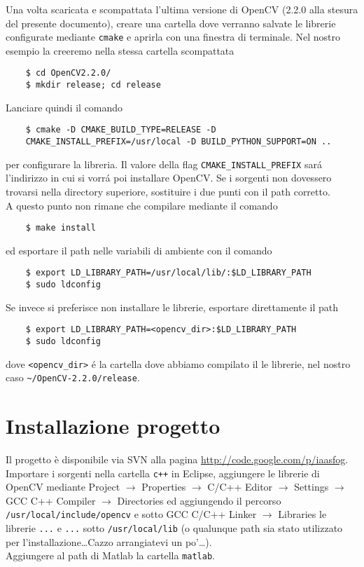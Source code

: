 \documentclass[12pt]{article}
\begin{document}
\noindent Una volta scaricata e scompattata l'ultima versione di OpenCV (2.2.0 alla stesura del presente documento), creare una cartella dove verranno salvate le librerie configurate mediante \verb|cmake| e aprirla con una finestra di terminale. Nel nostro esempio la creeremo nella stessa cartella scompattata

\begin{verbatim}
	$ cd OpenCV2.2.0/
	$ mkdir release; cd release
\end{verbatim}

\noindent Lanciare quindi il comando

\begin{verbatim}
	$ cmake -D CMAKE_BUILD_TYPE=RELEASE -D 
	CMAKE_INSTALL_PREFIX=/usr/local -D BUILD_PYTHON_SUPPORT=ON ..
\end{verbatim}

\noindent per configurare la libreria. Il valore della flag \verb|CMAKE_INSTALL_PREFIX| sar\'a l'indirizzo in cui si vorr\'a poi installare OpenCV. Se i sorgenti non dovessero trovarsi nella directory superiore, sostituire i due punti con il path corretto.\\

\noindent A questo punto non rimane che compilare mediante il comando

\begin{verbatim}
	$ make install
\end{verbatim}

\noindent ed esportare il path nelle variabili di ambiente con il comando

\begin{verbatim}
	$ export LD_LIBRARY_PATH=/usr/local/lib/:$LD_LIBRARY_PATH
	$ sudo ldconfig
\end{verbatim}

\noindent Se invece si preferisce non installare le librerie, esportare direttamente il path 

\begin{verbatim}
	$ export LD_LIBRARY_PATH=<opencv_dir>:$LD_LIBRARY_PATH
	$ sudo ldconfig
\end{verbatim}

\noindent dove \verb|<opencv_dir>| \'e la cartella dove abbiamo compilato il le librerie, nel nostro caso \verb|~/OpenCV-2.2.0/release|.

\section{Installazione progetto}
\noindent Il progetto è disponibile via SVN alla pagina \url{http://code.google.com/p/iaasfog}.\\
\noindent Importare i sorgenti nella cartella \verb|c++| in Eclipse, aggiungere le librerie di OpenCV mediante Project $\rightarrow$ Properties  $\rightarrow$ C\slash C++ Editor $\rightarrow$ Settings $\rightarrow$ GCC C++ Compiler $\rightarrow$ Directories ed aggiungendo il percorso \verb|/usr/local/include/opencv| e sotto GCC C\slash C++ Linker $\rightarrow$ Libraries le librerie \verb|...| e \verb|...| sotto \verb|/usr/local/lib| (o qualunque path sia stato utilizzato per l'installazione\dots Cazzo arrangiatevi un po'\dots).\\
\noindent Aggiungere al path di Matlab la cartella \verb|matlab|.
\end{document}
